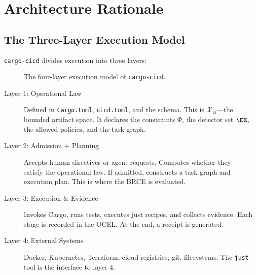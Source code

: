 \section{Architecture Rationale}

\subsection{The Three-Layer Execution Model}

\texttt{cargo-cicd} divides execution into three layers:

\begin{figure}[h]
\centering
{}
\caption{The four-layer execution model of \texttt{cargo-cicd}.}
\label{fig:cargo-cicd-layers}
\end{figure}

\begin{description}
  \item[Layer 1: Operational Law] Defined in \texttt{Cargo.toml}, \texttt{cicd.toml}, and the schema. This is $\mathcal{X}_B$---the bounded artifact space. It declares the constraints $\Phi$, the detector set $\EE$, the allowed policies, and the task graph.

  \item[Layer 2: Admission + Planning] Accepts human directives or agent requests. Computes whether they satisfy the operational law. If admitted, constructs a task graph and execution plan. This is where the BRCE is evaluated.

  \item[Layer 3: Execution \& Evidence] Invokes Cargo, runs tests, executes just recipes, and collects evidence. Each stage is recorded in the OCEL. At the end, a receipt is generated.

  \item[Layer 4: External Systems] Docker, Kubernetes, Terraform, cloud registries, git, filesystems. The \texttt{just} tool is the interface to layer 4.
\end{description}

